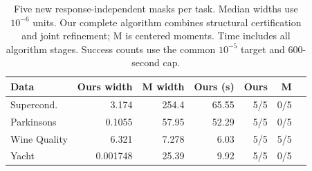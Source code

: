 \begin{table}[t]\centering\small\setlength{\tabcolsep}{2.5pt}
\caption{Five new response-independent masks per task. Median widths use $10^{-6}$ units. Our complete algorithm combines structural certification and joint refinement; M is centered moments. Time includes all algorithm stages. Success counts use the common $10^{-5}$ target and 600-second cap.}\label{tab:independent-v91}
\begin{tabular}{lrrrrrr}\toprule Data&Ours width&M width&Ours (s)&Ours&M\\\midrule
Supercond. & 3.174 & 254.4 & 65.55 & 5/5 & 0/5\\
Parkinsons & 0.1055 & 57.95 & 52.29 & 5/5 & 0/5\\
Wine Quality & 6.321 & 7.278 & 6.03 & 5/5 & 5/5\\
Yacht & 0.001748 & 25.39 & 9.92 & 5/5 & 0/5\\
\bottomrule\end{tabular}\end{table}
